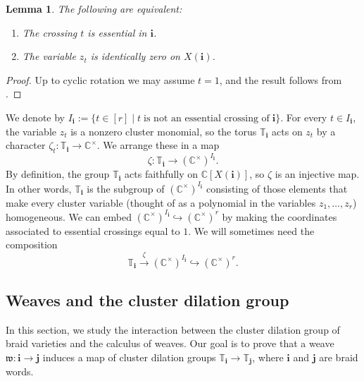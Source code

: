 \documentclass[a4paper, 11pt]{amsart}
\newcommand{\weave}{\mathfrak{w}}
\newcommand{\word}[1]{\mathbf{#1}}
\newcommand{\C}{\mathbb{C}}
\newcommand{\dil}[1]{\mathbb{T}_{#1}}
\newcommand{\noness}[1]{I_{#1}}
\newtheorem{lemma}[theorem]{Lemma}%
\theoremstyle{definition}
\begin{document}
\begin{lemma}
    The following are equivalent:
    \begin{enumerate}
    \item The crossing $t$ is essential in $\word{i}$.
    \item The variable $z_t$ is identically zero on $X(\word{i})$. 
    \end{enumerate}
\end{lemma}
\begin{proof}
   Up to cyclic rotation we may assume $t = 1$, and the result follows from \cite[Lemma 5.24.(1)]{CGGLSS}.
\end{proof}

We denote by $\noness{\word{i}} := \{t \in [r] \mid t \; \text{is not an essential crossing of} \; \word{i}\}$. For every $t \in I_{\word{i}}$, the variable $z_t$ is a nonzero cluster monomial, so the torus $\dil{\word{i}}$ acts on $z_t$ by a character $\zeta_t: \dil{\word{i}} \to  \C^{\times}$. We arrange these in a map
\begin{equation}\label{eq:zeta-embedding-1}
\zeta: \dil{\word{i}} \to (\C^{\times})^{\noness{\word{i}}}.
\end{equation}
By definition, the group $\dil{\word{i}}$ acts faithfully on $\C[X(\word{i})]$, so $\zeta$ is an injective map. In other words, $\dil{\word{i}}$ is the subgroup of $(\C^{\times})^{\noness{\word{i}}}$ consisting of those elements that make every cluster variable (thought of as a polynomial in the variables $z_1, \dots, z_r$) homogeneous. We can embed $(\C^{\times})^{\noness{\word{i}}} \hookrightarrow (\C^{\times})^{r}$ by making the coordinates associated to essential crossings equal to $1$. We will sometimes need the composition
\begin{equation}\label{eq:zeta-embedding-2}
\dil{\word{i}} \xrightarrow{\zeta} (\C^{\times})^{\noness{\word{i}}} \hookrightarrow (\C^{\times})^{r}.
\end{equation}

\subsection{Weaves and the cluster dilation group} In this section, we study the interaction between the cluster dilation group of braid varieties and the calculus of weaves.  Our goal is to prove that a weave $\weave: \word{i} \to \word{j}$ induces a map of cluster dilation groups $\dil{\word{i}} \to \dil{\word{j}}$, where $\word{i}$ and $\word{j}$ are braid words. 
\end{document}
